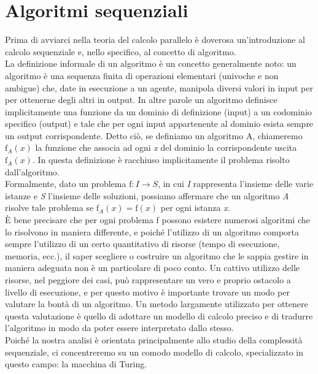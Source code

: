 \chapter{Algoritmi sequenziali}
Prima di avviarci nella teoria del calcolo parallelo è doverosa un'introduzione al calcolo sequenziale e, nello specifico, al concetto di algoritmo.\\
La definizione informale di un algoritmo è un concetto generalmente noto: un algoritmo è una sequenza finita di operazioni elementari (univoche e non ambigue) che, date in esecuzione a un agente, manipola diversi valori in input per per ottenerne degli altri in output. In altre parole un algoritmo definisce implicitamente una funzione da un dominio di definizione (input) a un codominio specifico (output) e tale che per ogni input appartenente al dominio esista sempre un output corrispondente. Detto ciò, se definiamo un algoritmo A, chiameremo $\mathrm{f}_{A}(x)$ la funzione che associa ad ogni \textit{x} del dominio la corrispondente uscita $\mathrm{f}_{A}(x)$. In questa definizione è racchiuso implicitamente il problema risolto dall'algoritmo.\\
Formalmente, dato un problema $\mathrm{f}: I \rightarrow S$, in cui \textit{I} rappresenta l'insieme delle varie istanze e \textit{S} l'insieme delle soluzioni, possiamo affermare che un algoritmo \textit{A} risolve tale problema se $\mathrm{f}_{A}(x) = \mathrm{f}(x)$ per ogni istanza \textit{x}.\\
È bene precisare che per ogni problema f possono esistere numerosi algoritmi che lo risolvono in maniera differente, e poiché l'utilizzo di un algoritmo comporta sempre l'utilizzo di un certo quantitativo di risorse (tempo di esecuzione, memoria, ecc.), il saper scegliere o costruire un algoritmo che le sappia gestire in maniera adeguata non è un particolare di poco conto. Un cattivo utilizzo delle risorse, nel peggiore dei casi, può rappresentare un vero e proprio ostacolo a livello di esecuzione, e per questo motivo è importante trovare un modo per valutare la bontà di un algoritmo. Un metodo largamente utilizzato per ottenere questa valutazione è quello di adottare un modello di calcolo preciso e di tradurre l'algoritmo in modo da poter essere interpretato dallo stesso.\\
Poiché la nostra analisi è orientata principalmente allo studio della complessità sequenziale, ci concentreremo su un comodo modello di calcolo, specializzato in questo campo: la macchina di Turing.
